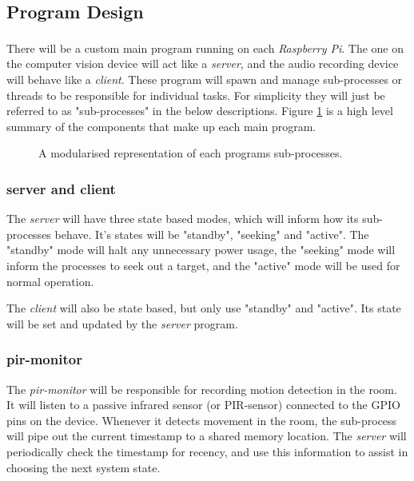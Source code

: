 \documentclass[11pt,a4paper,titlepage]{report}
\newcommand{\rpi}{\textit{Raspberry Pi\textsuperscript{\textregistered}}}
\begin{document}
\subsection{Program Design}

There will be a custom main program running on each \rpi. The one on the computer vision device will act like a \textit{server}, and the audio recording device will behave like a \textit{client}. These program will spawn and manage sub-processes or threads to be responsible for individual tasks. For simplicity they will just be referred to as "sub-processes" in the below descriptions. Figure \ref{fig:processes} is a high level summary of the components that make up each main program.

\begin{figure}
\begin{multicols}{2}
\columnbreak
{}
\end{multicols}
\caption{A modularised representation of each programs sub-processes.}\label{fig:processes}
\end{figure}

\subsubsection{server and client}


The \textit{server} will have three state based modes, which will inform how its sub-processes behave. It's states will be "standby", "seeking" and "active". The "standby" mode will halt any unnecessary power usage, the "seeking" mode will inform the processes to seek out a target, and the "active" mode will be used for normal operation. 

The \textit{client} will also be state based, but only use "standby" and "active". Its state will be set and updated by the \textit{server} program.


\subsubsection{pir-monitor}

The \textit{pir-monitor} will be responsible for recording motion detection in the room. It will listen to a passive infrared sensor (or PIR-sensor) connected to the GPIO pins on the device. Whenever it detects movement in the room, the sub-process will pipe out the current timestamp to a shared memory location. The \textit{server} will periodically check the timestamp for recency, and use this information to assist in choosing the next system state.
\end{document}
